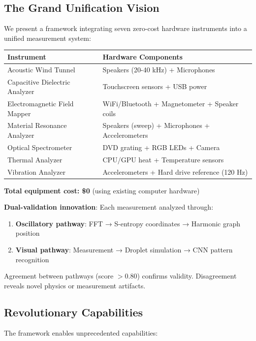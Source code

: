 \documentclass[12pt,a4paper]{article}
\begin{document}
\subsection{The Grand Unification Vision}

We present a framework integrating seven zero-cost hardware instruments into a unified measurement system:

\begin{center}
\begin{tabular}{ll}
\toprule
\textbf{Instrument} & \textbf{Hardware Components} \\
\midrule
Acoustic Wind Tunnel & Speakers (20-40 kHz) + Microphones \\
Capacitive Dielectric Analyzer & Touchscreen sensors + USB power \\
Electromagnetic Field Mapper & WiFi/Bluetooth + Magnetometer + Speaker coils \\
Material Resonance Analyzer & Speakers (sweep) + Microphones + Accelerometers \\
Optical Spectrometer & DVD grating + RGB LEDs + Camera \\
Thermal Analyzer & CPU/GPU heat + Temperature sensors \\
Vibration Analyzer & Accelerometers + Hard drive reference (120 Hz) \\
\bottomrule
\end{tabular}
\end{center}

\textbf{Total equipment cost: \$0} (using existing computer hardware)

\textbf{Dual-validation innovation}: Each measurement analyzed through:
\begin{enumerate}
\item \textbf{Oscillatory pathway}: FFT → S-entropy coordinates → Harmonic graph position
\item \textbf{Visual pathway}: Measurement → Droplet simulation → CNN pattern recognition
\end{enumerate}

Agreement between pathways (score $> 0.80$) confirms validity. Disagreement reveals novel physics or measurement artifacts.

\subsection{Revolutionary Capabilities}

The framework enables unprecedented capabilities:
\end{document}
